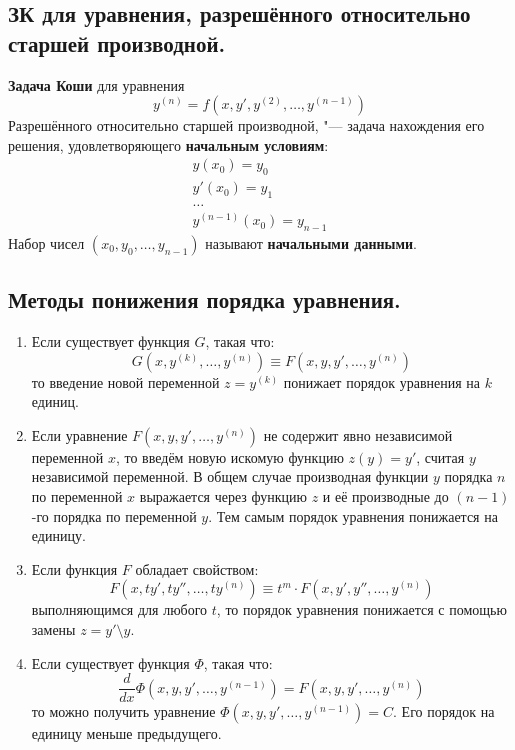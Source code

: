 \documentclass{article}
\begin{document}
\subsection{ЗК для уравнения, разрешённого относительно старшей производной.}
\textbf{Задача Коши} для уравнения
\begin{equation*}
    y^{(n)} = f(x, y', y^{(2)}, \ldots, y^{(n-1)})
\end{equation*}
Разрешённого относительно старшей производной, "--- задача нахождения его решения, удовлетворяющего \textbf{начальным условиям}:
\begin{gather*}
    y(x_0) = y_0\\
    y'(x_0) = y_1\\
    \ldots\\
    y^{(n - 1)}(x_0) = y_{n-1}
\end{gather*}
Набор чисел $(x_0, y_0, \ldots, y_{n-1})$ называют \textbf{начальными данными}.

\subsection{Методы понижения порядка уравнения.}
\begin{enumerate}
    \item Если существует функция $G$, такая что: 
    \begin{equation*}
        G(x, y^{(k)}, \ldots, y^{(n)}) \equiv F(x, y, y', \ldots, y^{(n)})
    \end{equation*}
    то введение новой переменной $z = y^{(k)}$ понижает порядок уравнения на $k$ единиц.
    \item Если уравнение $F(x, y, y', \ldots, y^{(n)})$ не содержит явно независимой переменной $x$, то введём новую искомую функцию $z(y) = y'$, считая $y$ независимой переменной. В общем случае производная функции $y$ порядка $n$ по переменной $x$ выражается через функцию $z$ и её производные до $(n − 1)$-го порядка по переменной $y$. Тем самым порядок уравнения понижается на единицу.
    \item Если функция $F$ обладает свойством:
    \begin{equation*}
        F(x, ty', ty'', \ldots, ty^{(n)}) \equiv t^m\cdot F(x, y', y'', \ldots, y^{(n)})
    \end{equation*}
    выполняющимся для любого $t$, то порядок уравнения понижается с помощью замены $z =y'\setminus y$.
    \item Если существует функция $\varPhi$, такая что:
    \begin{equation*}
        \frac{d}{dx} \varPhi(x, y, y', \ldots, y^{(n-1)}) = F(x, y, y', \ldots, y^{(n)})
    \end{equation*}
    то можно получить уравнение $\varPhi(x, y, y', \ldots, y^{(n-1)}) = C$. Его порядок на единицу меньше предыдущего.
\end{enumerate}
\end{document}
